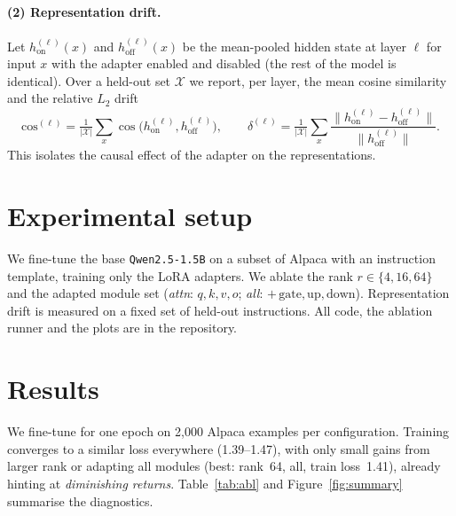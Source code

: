 \documentclass[11pt,a4paper]{article}
\begin{document}
\paragraph{(2) Representation drift.} Let $h^{(\ell)}_{\text{on}}(x)$ and
$h^{(\ell)}_{\text{off}}(x)$ be the mean-pooled hidden state at layer $\ell$ for
input $x$ with the adapter enabled and disabled (the rest of the model is
identical). Over a held-out set $\mathcal{X}$ we report, per layer, the mean
cosine similarity and the relative $L_2$ drift
\[
  \text{cos}^{(\ell)} = \tfrac{1}{|\mathcal X|}\!\sum_{x}\!\cos\big(h^{(\ell)}_{\text{on}},h^{(\ell)}_{\text{off}}\big),
  \qquad
  \delta^{(\ell)} = \tfrac{1}{|\mathcal X|}\!\sum_{x}\!\frac{\lVert h^{(\ell)}_{\text{on}}-h^{(\ell)}_{\text{off}}\rVert}{\lVert h^{(\ell)}_{\text{off}}\rVert}.
\]
This isolates the causal effect of the adapter on the representations.

\section{Experimental setup}
We fine-tune the base \texttt{Qwen2.5-1.5B} on a subset of Alpaca with an
instruction template, training only the LoRA adapters. We ablate the rank
$r\in\{4,16,64\}$ and the adapted module set
(\textit{attn}: $q,k,v,o$; \textit{all}: $+\,\text{gate},\text{up},\text{down}$).
Representation drift is measured on a fixed set of held-out instructions. All
code, the ablation runner and the plots are in the repository.

\section{Results}
We fine-tune for one epoch on 2{,}000 Alpaca examples per configuration. Training
converges to a similar loss everywhere (1.39--1.47), with only small gains from
larger rank or adapting all modules (best: rank~64, all, train loss~1.41),
already hinting at \emph{diminishing returns}. Table~\ref{tab:abl} and
Figure~\ref{fig:summary} summarise the diagnostics.
\end{document}
